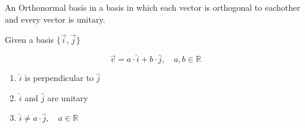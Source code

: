 \documentclass{article}
\begin{document}
An Orthonormal basis in a basis in which each vector is orthogonal to eachother and every vector
is unitary.


Given a basis \(\{\vec{i}, \vec{j}\}\)

\[
    \vec{v} = a \cdot \hat{i} + b \cdot \hat{j},
    \quad a,b \in \mathbb{R}
\]

\begin{enumerate} %
    \item \(\hat{i}\) is perpendicular to \(\hat{j}\)
    \item \(\hat{i}\) and \(\hat{j}\) are unitary
    \item \(\hat{i} \neq a\cdot\hat{j},\quad a\in \mathbb{R}\)  
\end{enumerate}

\pagebreak
\end{document}
